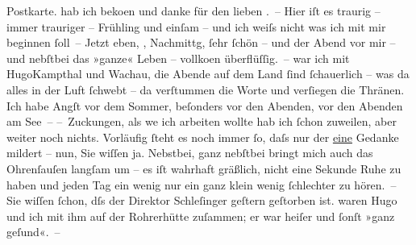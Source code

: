 \begin{ledgroupsized}[t]{13cm}
{{{                  Postkarte.}}}\label{K_L00921_1h} hab ich beko{\geminationm}en und danke für den
               lieben \label{K_L00921_2v}\label{K_L00921_2h}. – Hier iſt es traurig – immer trauriger – Frühling und einſam –
               und ich weiſs nicht was ich mit mir beginnen ſoll –\pend
           \pstart
           Jetzt eben, \label{K_L00921_3v}\label{K_L00921_3h}, Nachmittg, ſehr ſchön
               – und der Abend vor mir – und nebſtbei das »ganze« Leben – vollko{\geminationm}en {\pb}überflüſſig. –\pend
           \pstart
           \label{K_L00921_4v}\label{K_L00921_4h} war ich mit HugoKampthal und Wachau, die Abende auf dem Land ſind ſchauerlich – was da alles in der Luft
               ſchwebt – da verſtummen die Worte und verſiegen die Thränen. Ich habe Angſt vor dem
               Sommer, beſonders vor den Abenden, vor den Abenden am See –\pend
           \pstart
           – Zuckungen, als we{\geminationn} ich {\pb}arbeiten wollte hab ich ſchon zuweilen, aber weiter noch nichts. Vorläufig ſteht es
               noch immer ſo, daſs nur der \uline{eine} Gedanke mildert –
               nun, Sie wiſſen ja.\pend
           \pstart
           Nebstbei, ganz nebſtbei bringt mich auch das Ohrenſauſen langſam um – es iſt wahrhaft
               gräßlich, nicht eine Sekunde Ruhe zu haben und jeden Tag ein wenig nur {\pb}ein ganz klein wenig ſchlechter zu hören. –\pend
           \pstart
           Sie wiſſen ſchon, dſs der Direktor Schleſinger
               geſtern geſtorben ist. \label{K_L00921_5v}\label{K_L00921_5h} waren Hugo und ich mit ihm auf der Rohrerhütte zuſammen; er war heiſer und ſonſt »ganz geſund«. –\pend

\end{ledgroupsized}
